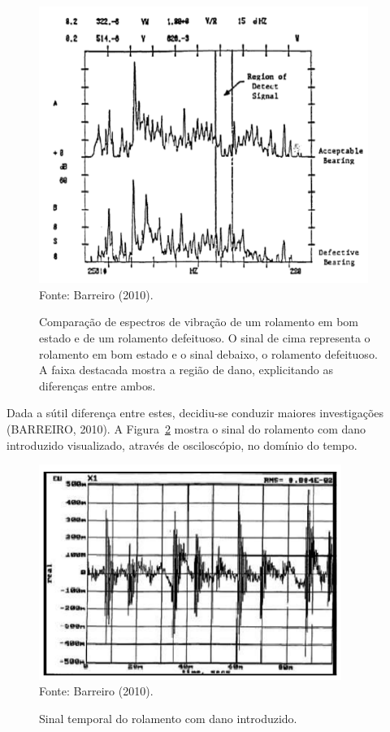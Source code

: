 \documentclass[
	12pt,				
	oneside,			
	a4paper,			
	english,			
	brazil,			
	]{abntex2ppgsi}
\begin{document}
\begin{figure}[H]
\centering
\caption {Comparação de espectros de vibração de um rolamento em bom estado e de um rolamento defeituoso. O sinal de cima representa o rolamento em bom estado e o sinal debaixo, o rolamento defeituoso. A faixa destacada mostra a região de dano, explicitando as diferenças entre ambos.}
\includegraphics[width=\textwidth,height=90mm,keepaspectratio]{fft_sinal_barreiro} \\
Fonte: Barreiro (2010).
\label{fft_sinal_barreiro}
\end{figure}

Dada a sútil diferença entre estes, decidiu-se conduzir maiores investigações (BARREIRO, 2010). A Figura~\ref{sinal_temporal_rolamento_barreiro} mostra o sinal do rolamento com dano introduzido visualizado, através de osciloscópio, no domínio do tempo.

\begin{figure}[H]
\centering
\caption {Sinal temporal do rolamento com dano introduzido.}
\includegraphics[width=\textwidth,height=70mm,keepaspectratio]{sinal_temporal_rolamento_barreiro} \\
Fonte: Barreiro (2010).
\label{sinal_temporal_rolamento_barreiro}
\end{figure}
\end{document}
